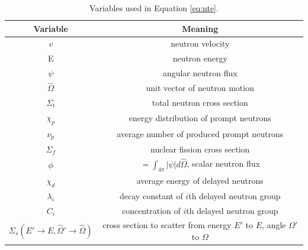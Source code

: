 \linespread{1}
\begin{table}[h]
\caption{Variables used in Equation \ref{eq:nte}.}
\centering
\begin{tabular}{c|c}
Variable & Meaning \\
\hline
$v$ & neutron velocity \\
E & neutron energy \\
$\psi$ & angular neutron flux \\
$\hat{\Omega}$ & unit vector of neutron motion \\
$\Sigma_t$ & total neutron cross section \\
$\chi_p$ & energy distribution of prompt neutrons \\
$\nu_p$ & average number of produced prompt neutrons \\
$\Sigma_f$ & nuclear fission cross section \\
$\phi$ & $=\int_{4\pi} |\psi| d\hat{\Omega}$, scalar neutron flux \\
$\chi_d$ & average energy of delayed neutrons \\
$\lambda_i$ & decay constant of $i$th delayed neutron group \\
$C_i$ & concentration of $i$th delayed neutron group \\
$\Sigma_s(E'\rightarrow E,\hat{\Omega}'\rightarrow \hat{\Omega})$ & cross section to scatter from energy $E'$ to $E$, angle $\Omega'$ to $\Omega$ \\
\end{tabular}
\end{table}
\linespread{2}

